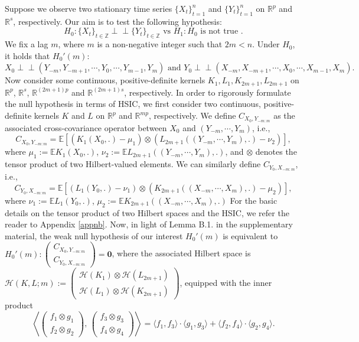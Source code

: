 \documentclass[11pt]{article}
\newcommand{\indep}{\perp \!\!\! \perp}
\newcommand{\bE}{\mathbb{E}}
\theoremstyle{plain}
\theoremstyle{definition}
\theoremstyle{remark}
\begin{document}
\indent Suppose we observe two stationary time series $\{X_t\}_{t=1}^{n}$ and $\{Y_t\}_{t=1}^{n}$ on $\mathbb{R}^p$ and $\mathbb{R}^s$, respectively. Our aim is to test the following hypothesis:
$$H_0: \{X_t\}_{t\in \mathbb{Z}}\indep \{Y_t\}_{t\in \mathbb{Z}}\text{ vs }H_1: H_0\text{ is not true }.$$
We fix a lag $m$, where $m$ is a non-negative integer such that $2m<n$. Under $H_0$, it holds that $H_0'(m)$: 
$X_0 \indep (Y_{-m},Y_{-m+1},\cdots,Y_0,\cdots, Y_{m-1}, Y_m)\text{ and } Y_0\indep (X_{-m},X_{-m+1},\cdots,X_0,\cdots, X_{m-1}, X_m).$
Now consider some continuous, positive-definite kernels $K_1, L_1, K_{2m+1}, L_{2m+1}$ on $\mathbb{R}^p$,  $\mathbb{R}^s$, $\mathbb{R}^{(2m+1)p}$ and $\mathbb{R}^{(2m+1)s}$, respectively.
In order to rigorously formulate the null hypothesis in terms of HSIC, we first consider two continuous, positive-definite kernels $K$ and $L$ on $\mathbb{R}^p$ and $ \mathbb{R}^{mp}$, respectively. We define $C_{X_0,Y_{-m:m}}$ as the associated cross-covariance operator between $X_0$ and $(Y_{-m},\cdots,Y_{m})$, i.e.,
\begin{equation}\label{eqn:cross_cov_indep_upo_lag_m}
C_{X_0,Y_{-m:m}}=\bE \left[\left(K_1(X_0,.)-\mu_1\right)\otimes \left(L_{2m+1}((Y_{-m},\cdots,Y_{m}),.)-\nu_2\right)\right],
\end{equation}
where $\mu_1:=\bE K_1(X_0,.)$, $\nu_2:=\bE L_{2m+1}((Y_{-m},\cdots,Y_{m}),.)$, and $\otimes $ denotes the tensor product of two Hilbert-valued elements. We can similarly define $C_{Y_0, X_{-m:m}}$, i.e.,
\begin{equation}\label{eqn:cross_cov_indep_upo_lag_m_2}
C_{Y_0,X_{-m:m}}=\bE \left[\left(L_1(Y_0,.)-\nu_1\right)\otimes \left(K_{2m+1}((X_{-m},\cdots,X_{m}),.)-\mu_2\right)\right],
\end{equation}
where $\nu_1:=\bE L_1(Y_0,.)$, $\mu_2:=\bE K_{2m+1}((X_{-m},\cdots,X_{m}),.)$
For the basic details on the tensor product of two Hilbert spaces and the HSIC, we refer the reader to Appendix \ref{appnb}.  Now, in light of Lemma B.1. in the supplementary material, the weak null hypothesis of our interest $H_0'(m)$ is equivalent to
$H_0'(m):\begin{pmatrix}
    C_{X_0,Y_{-m:m}}\\
    C_{Y_0,X_{-m:m}}
\end{pmatrix}=\mathbf{0}$, 
where the associated Hilbert space is $\mathcal{H}(K,L;m):=\begin{pmatrix}
    \mathcal{H}(K_1)\otimes \mathcal{H}(L_{2m+1})\\
    \mathcal{H}(L_1)\otimes \mathcal{H}(K_{2m+1})
\end{pmatrix}$, equipped with the inner product
$$\left\langle \begin{pmatrix}
    f_1\otimes g_1\\
    f_2 \otimes g_2
\end{pmatrix},\,\begin{pmatrix}
    f_3\otimes g_3\\
    f_4 \otimes g_4
\end{pmatrix}\right\rangle=\langle f_1,f_3\rangle\cdot \langle g_1, g_3\rangle+\langle f_2,f_4\rangle\cdot \langle g_2, g_4\rangle.$$
\end{document}
